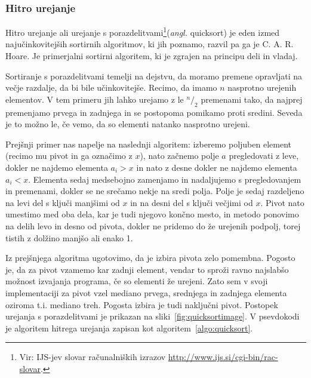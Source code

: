 \documentclass[a4paper,oneside,12pt]{article}
\begin{document}
\subsubsection{Hitro urejanje}
\label{chapter:quicksort}
Hitro urejanje ali urejanje s porazdelitvami\footnote{Vir: IJS-jev slovar računalniških izrazov
\url{http://www.ijs.si/cgi-bin/rac-slovar}.}(\emph{angl.} quicksort) je eden izmed
najučinkovitejših sortirnih algoritmov, ki jih poznamo, razvil pa ga je C. A. R. Hoare.
Je primerjalni sortirni algoritem, ki je zgrajen na principu deli in vladaj.

Sortiranje s porazdelitvami temelji na dejstvu, da moramo premene opravljati na večje
razdalje, da bi bile učinkovitejše. Recimo, da imamo $n$ nasprotno urejenih elementov.
V tem primeru jih lahko urejamo z le $^n/_2$ premenami tako, da najprej premenjamo prvega
in zadnjega in se postopoma pomikamo proti sredini. Seveda je to možno le, če vemo, da so 
elementi natanko nasprotno urejeni.

Prejšnji primer nas napelje na naslednji algoritem: 
izberemo poljuben element (recimo mu pivot in ga označimo z $x$), nato začnemo 
polje $a$ pregledovati z leve, dokler ne najdemo elementa $a_i > x$ in nato z desne dokler ne 
najdemo elementa $a_i < x$. Elementa sedaj medsebojno zamenjamo in nadaljujemo s 
pregledovanjem in premenami, dokler se ne srečamo nekje na sredi polja.
Polje je sedaj razdeljeno na levi del s ključi manjšimi od $x$ in na desni del
s ključi večjimi od $x$. Pivot nato umestimo med oba dela, kar je tudi njegovo končno
mesto, in metodo ponovimo na delih levo in desno od pivota, dokler ne pridemo do že urejenih
podpolj, torej tistih z dolžino manjšo ali enako 1. 

Iz prejšnjega algoritma ugotovimo, da je izbira pivota zelo
pomembna. Pogosto je, da za pivot vzamemo kar zadnji element, vendar to sproži ravno
najslabšo možnost izvajanja programa, če so elementi že urejeni. Zato sem v svoji
implementaciji za pivot vzel mediano prvega, srednjega in zadnjega elementa oziroma t.i.
mediano treh. Pogosta izbira je tudi naključni pivot. Postopek urejanja s
porazdelitvami je prikazan na sliki~\ref{fig:quicksortimage}.
V psevdokodi je algoritem hitrega urejanja zapisan kot algoritem~\ref{algo:quicksort}.
\end{document}
